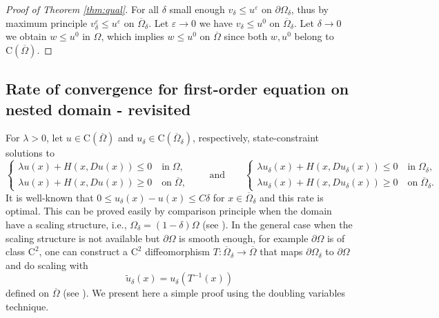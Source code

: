 \documentclass[11pt,reqno]{amsart}
\numberwithin{figure}{section}
\theoremstyle{plain}
\theoremstyle{remark}
\numberwithin{equation}{section}
\newcommand{\rmC}{\mathrm{C}}
\begin{document}
\begin{proof}[Proof of Theorem \ref{thm:qual}]
For all $\delta$ small enough $v_\delta\leq u^\varepsilon$ on $\partial \Omega_\delta$, thus by maximum principle $v^\varepsilon_\delta \leq u^\varepsilon$ on $\overline{\Omega}_\delta$. Let $\varepsilon\to 0$ we have $v_\delta \leq u^0$ on $\overline{\Omega}_\delta$.
Let $\delta\rightarrow 0$ we obtain $w\leq u^0$ in $\Omega$, which implies $w\leq u^0$ on $\overline{\Omega}$ since both $w,u^0$ belong to $\rmC(\overline{\Omega})$.
\end{proof}

\subsection{Rate of convergence for first-order equation on nested domain - revisited}
For $\lambda>0$, let $u\in \rmC(\overline{\Omega})$ and $u_\delta\in \rmC(\overline{\Omega}_\delta)$, respectively, state-constraint solutions to 
\begin{equation*}
    \begin{cases}
    \lambda u(x)+H(x,Du(x)) \leq 0 \quad\text{in}\;\Omega,\\
    \lambda u(x)+H(x,Du(x)) \geq 0 \quad\text{on}\;\overline{\Omega},
    \end{cases}\qquad\text{and}\qquad 
    \begin{cases}
    \lambda u_\delta(x)+H(x,Du_\delta(x)) \leq 0 \quad\text{in}\;\Omega_\delta,\\
    \lambda u_\delta(x)+H(x,Du_\delta(x)) \geq 0 \quad\text{on}\;\overline{\Omega}_\delta.
    \end{cases}
\end{equation*} 
It is well-known that $0\leq u_\delta(x) - u(x) \leq C\delta$ for $x\in\overline{\Omega}_\delta$ and this rate is optimal. This can be proved easily by comparison principle when the domain have a scaling structure, i.e., $\Omega_\delta = (1-\delta)\Omega$ (see \cite{kim_state-constraint_2020}). In the general case when the scaling structure is not available but $\partial\Omega$ is smooth enough, for example $\partial\Omega$ is of class $\mathrm{C}^2$, one can construct a $\rmC^2$ diffeomorphism $T:\overline{\Omega}_\delta\to \overline{\Omega}$ that maps $\partial\Omega_\delta$ to $\partial\Omega$ and do scaling with 
\begin{equation*}
 \tilde{u}_\delta(x) = u_\delta\left(T^{-1}(x)\right)   
\end{equation*}
defined on $\overline{\Omega}$ (see \cite{Capuzzo-Dolcetta1990}). We present here a simple proof using the doubling variables technique.
\end{document}
